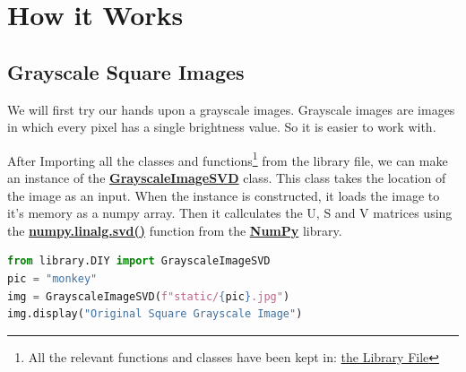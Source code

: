 \section{How it Works}

	\subsection{Grayscale Square Images}

	We will first try our hands upon a grayscale images. Grayscale images are images in which every pixel has a single brightness value. So it is easier to work with.
	
	After Importing all the classes and functions\footnote{All the relevant functions and classes have been kept in: \href{https://github.com/PeithonKing/comp_phys_P346/blob/main/library/DIY.py}{the Library File}} from the library file, we can make an instance of the \href{https://github.com/PeithonKing/comp_phys_P346/blob/main/library/DIY.py#L43-L69}{\textbf{GrayscaleImageSVD}} class. This class takes the location of the image as an input. When the instance is constructed, it loads the image to it's memory as a numpy array. Then it callculates the U, S and V matrices using the \href{https://numpy.org/doc/stable/reference/generated/numpy.linalg.svd.html}{\textbf{numpy.linalg.svd()}} function from the \href{https://numpy.org/}{\textbf{NumPy}} library.
	\vspace{2mm}

	\begin{center}
		\noindent{}
	\end{center}

	\begin{lstlisting}[language=Python]
from library.DIY import GrayscaleImageSVD
pic = "monkey"
img = GrayscaleImageSVD(f"static/{pic}.jpg")
img.display("Original Square Grayscale Image")
	\end{lstlisting}
	
